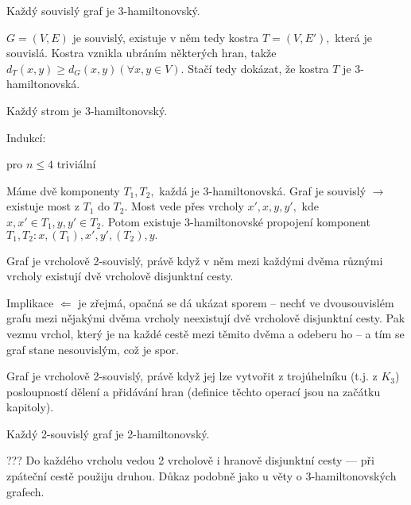 \begin{veta}
Každý souvislý graf je 3-hamiltonovský.

\medskip
\begin{dukaz}
$G=(V,E)$ je souvislý, existuje v něm tedy kostra $T=(V,E'),$ která je souvislá. Kostra vznikla ubráním některých hran, takže $d_T(x,y) \geq d_G(x,y) (\forall x,y \in V).$ Stačí tedy dokázat, že kostra $T$ je 3-hamiltonovská.
\end{dukaz}
\end{veta}

\begin{lemma}
Každý strom je 3-hamiltonovský.

\medskip
\begin{dukaz}
Indukcí:
\begin{penumerate}
\item pro $n \leq 4$ triviální
\item Máme dvě komponenty $T_1,T_2,$ každá je 3-hamiltonovská. Graf je souvislý $\rightarrow$ existuje most z $T_1$ do $T_2.$ Most vede přes vrcholy $x',x,y,y',$ kde $x,x' \in T_1, y,y' \in T_2.$ Potom existuje 3-hamiltonovské propojení komponent $T_1,T_2: x,(T_1),x',y',(T_2),y.$
\end{penumerate}
\end{dukaz}
\end{lemma}

\begin{veta}
Graf je vrcholově 2-souvislý, právě když v něm mezi každými dvěma různými vrcholy existují dvě vrcholově disjunktní cesty.

\medskip
\begin{dukaz}
Implikace $\Leftarrow$ je zřejmá, opačná se dá ukázat sporem -- nechť ve dvousouvislém grafu mezi nějakými dvěma vrcholy neexistují dvě vrcholově disjunktní cesty. Pak vezmu vrchol, který je na každé cestě mezi těmito dvěma a odeberu ho -- a tím se graf stane nesouvislým, což je spor.
\end{dukaz}
\end{veta}

\begin{veta}
Graf je vrcholově 2-souvislý, právě když jej lze vytvořit z trojúhelníku (t.j. z $K_3$) posloupností dělení a přidávání hran (definice těchto operací jsou na začátku kapitoly).
\end{veta}

\begin{veta}
Každý 2-souvislý graf je 2-hamiltonovský.

\medskip
\begin{dukaz}
??? Do každého vrcholu vedou 2 vrcholově i hranově disjunktní cesty --- při zpáteční cestě použiju druhou. Důkaz podobně jako u věty o 3-hamiltonovských grafech.
\end{dukaz}
\end{veta}


